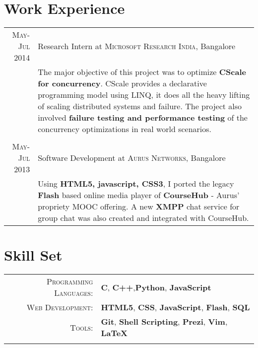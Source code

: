 \documentclass[a4paper,10pt]{article} %
\begin{document}

\section{Work Experience}

\begin{tabular}{r|p{11cm}}
    \textsc{May-Jul 2014} & Research Intern at \textsc{Microsoft Research India}, Bangalore\emph{}\\
                          & \footnotesize{The major objective of this project was to optimize
                            \textbf{CScale for concurrency}. CScale provides a declarative programming model
                            using LINQ, it does all the heavy lifting of scaling distributed systems and
                            failure. The project also involved \textbf{failure testing and performance testing}
                            of the concurrency optimizations in real world scenarios.}\\
                            \\

    \textsc{May-Jul 2013} & Software Development at \textsc{Aurus Networks}, Bangalore\emph{}\\
                          & \footnotesize{Using \textbf{HTML5, javascript, CSS3}, I ported the legacy
                            \textbf{Flash} based online media player of \textbf{CourseHub} - Aurus'
                            propriety MOOC offering. A new \textbf{XMPP} chat service for group chat
                            was also created and integrated with CourseHub.}\\

\end{tabular}

\section{Skill Set}

\begin{tabular}{rl}

    \textsc{Programming Languages}: %
            & \textbf{C}, \textbf{C++},\textbf{Python}, \textbf{JavaScript} \\
    \textsc{Web Development}: %
            & \textbf{HTML5}, \textbf{CSS}, \textbf{JavaScript}, \textbf{Flash}, \textbf{SQL}\\
    \textsc{Tools}: %
            & \textbf{Git}, \textbf{Shell Scripting}, \textbf{Prezi}, \textbf{Vim}, \textbf{LaTeX}\\
\\

\end{tabular}
\end{document}
